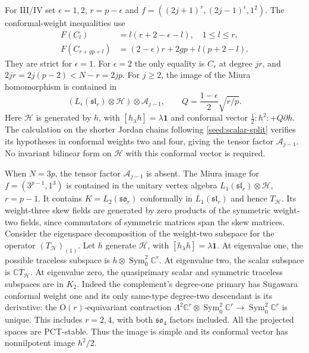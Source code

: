 \documentclass[11pt,a4paper]{amsart}
\numberwithin{equation}{section}
\theoremstyle{definition}
\theoremstyle{remark}
\newcommand{\C}{\mathbb C}
\newcommand{\sog}{\mathfrak{so}}
\newcommand{\slg}{\mathfrak{sl}}
\newcommand{\Sym}{\operatorname{Sym}}
\begin{document}
For III/IV set $\epsilon=1,2$, $r=p-\epsilon$ and
$f=((2j+1)^r,(2j-1)^\epsilon,1^2)$. The conformal-weight inequalities use
$$
\begin{aligned}
 F(C_l)&=l(r+2-\epsilon-l),\quad1\le l\le r,\\
 F(C_{r+gp+l})&=(2-\epsilon)r+2gp+l(p+2-l).
\end{aligned}
$$
They are strict for $\epsilon=1$. For $\epsilon=2$ the only equality
is $C_r$ at degree $jr$, and $2jr=2j(p-2)<N-r=2jp$.
For $j\ge2$, the image of the Miura homomorphism is contained in
$$
 (L_\epsilon(\slg_r)\otimes\mathcal H)\otimes\mathcal A_{j-1},
 \qquad Q=\frac{1-\epsilon}{2}\sqrt{r/p}.
$$
Here $\mathcal H$ is generated by $h$, with
$[h_\lambda h]=\lambda\mathbf1$ and conformal vector
$\tfrac12:h^2:+Q\partial h$.
The calculation on the shorter Jordan chains following
\cref{seed:scalar-split} verifies its hypotheses in conformal
weights two and four, giving the tensor factor $\mathcal A_{j-1}$.
No invariant bilinear form on $\mathcal H$ with this conformal vector is required.

When $N=3p$, the tensor factor $\mathcal A_{j-1}$ is absent.
The Miura image for $f=(3^{p-1},1^3)$ is contained in the unitary vertex algebra
$L_1(\slg_r)\otimes\mathcal H$, $r=p-1$. It contains
$K=L_2(\sog_r)$ conformally in $L_1(\slg_r)$ and hence $T_{\mathcal H}$.
Its weight-three skew fields are generated by zero products of the
symmetric weight-two fields, since commutators of symmetric matrices
span the skew matrices. Consider the eigenspace decomposition of the weight-two subspace
for the operator $(T_{\mathcal H})_{(1)}$. Let $h$ generate
$\mathcal H$, with $[h_\lambda h]=\lambda\mathbf1$.
At eigenvalue one, the possible traceless subspace is
$h\otimes\Sym^2_0\C^r$. At eigenvalue two, the scalar subspace is $\C T_{\mathcal H}$.
At eigenvalue zero, the quasiprimary scalar and symmetric traceless subspaces
are in $K_2$. Indeed the complement's degree-one primary has Sugawara
conformal weight one and its only same-type degree-two descendant is its
derivative: the $\mathrm O(r)$-equivariant contraction
$\Lambda^2\C^r\otimes\Sym^2_0\C^r\to\Sym^2_0\C^r$ is unique.
This includes $r=2,4$, with both $\sog_4$ factors included.
All the projected spaces are PCT-stable. Thus the image is simple and
its conformal vector has nonnilpotent image $h^2/2$.
\end{document}
